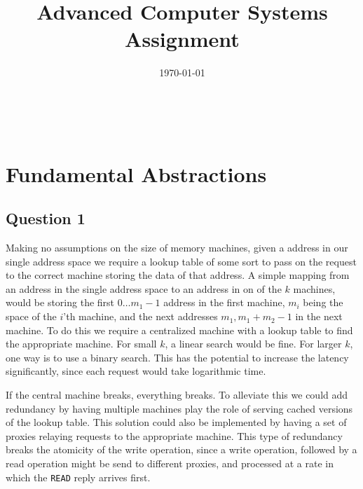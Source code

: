 \documentclass[10pt,a4paper]{article}
\title
{
    Advanced Computer Systems \\
    {\Large Assignment \assignmentnumber}
}
\author
{
    \authform{Hans J. T. Stephensen}{abc123}
    \and
    \authform{?}{abc123}
    \and
    \authform{Casper B. Hansen}{fvx507}
}
\date{\today}
\newcommand{\theabstract}
{
    \lipsum[1-1]
}
\newcommand{\colbreak}{{\ }\vfill\columnbreak}
\begin{document}
\clearpage
\maketitle
\thispagestyle{empty}

\setlength{\columnsep}{0pt}
\begin{multicols}{2}
    \abstract{\theabstract}
    \colbreak
    \tableofcontents
\end{multicols}
\setlength{\columnsep}{10pt}
\clearpage



\section{Fundamental Abstractions}

\subsection{Question 1}

Making no assumptions on the size of memory machines, given a address in our single address space we require a lookup table of some sort to pass on the request to the correct machine storing the data of that address. A simple mapping from an address in the single address space to an address in on of the $k$ machines, would be storing the first $0 \dots m_1-1$ address in the first machine, $m_i$ being the space of the $i$'th machine, and the next addresses $m_1, m_1+m_2-1$ in the next machine. To do this we require a centralized machine with a lookup table to find the appropriate machine. For small $k$, a linear search would be fine. For larger $k$, one way is to use a binary search. This has the potential to increase the latency significantly, since each request would take logarithmic time.

If the central machine breaks, everything breaks. To alleviate this we could add redundancy by having multiple machines play the role of serving cached versions of the lookup table. This solution could also be implemented by having a set of proxies relaying requests to the appropriate machine. This type of redundancy breaks the atomicity of the write operation, since a write operation, followed by a read operation might be send to different proxies, and processed at a rate in which the {\tt READ} reply arrives first.
\end{document}
